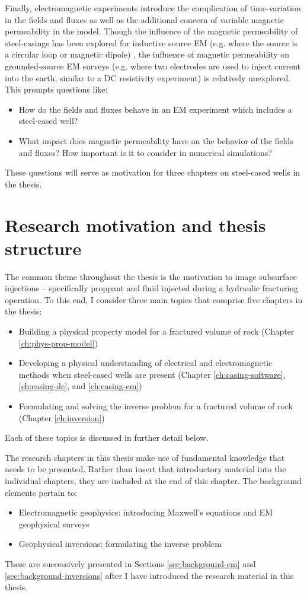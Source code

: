 Finally, electromagnetic experiments introduce the complication of time-variation in the fields and fluxes as well as the additional concern of variable magnetic permeability in the model. Though the influence of the magnetic permeability of steel-casings has been explored for inductive source EM (e.g. where the source is a circular loop or magnetic dipole) \citep{wuhabashy1994}, the influence of magnetic permeability on grounded-source EM surveys (e.g. where two electrodes are used to inject current into the earth, similar to a DC resistivity experiment) is relatively unexplored. This prompts questions like:
\begin{itemize}
\item{How do the fields and fluxes behave in an EM experiment which includes a steel-cased well?}
\item{What impact does magnetic permeability have on the behavior of the fields and fluxes? How important is it to consider in numerical simulations?}
\end{itemize}

These questions will serve as motivation for three chapters on steel-cased wells in the thesis.

\section{Research motivation and thesis structure}
The common theme throughout the thesis is the motivation to image subsurface injections -- specifically proppant and fluid injected during a hydraulic fracturing operation. To this end, I consider three main topics that comprise five chapters in the thesis:
\begin{itemize}
    \item{Building a physical property model for a fractured volume of rock (Chapter \ref{ch:phys-prop-model})}
    \item{Developing a physical understanding of electrical and electromagnetic methods when steel-cased wells are present (Chapter \ref{ch:casing-software}, \ref{ch:casing-dc}, and \ref{ch:casing-em})}
    \item{Formulating and solving the inverse problem for a fractured volume of rock (Chapter \ref{ch:inversion})}
\end{itemize}
Each of these topics is discussed in further detail below.

The research chapters in this thesis make use of fundamental knowledge that needs to be presented. Rather than insert that introductory material into the individual chapters, they are included at the end of this chapter. The background elements pertain to:
\begin{itemize}
\item{Electromagnetic geophysics: introducing Maxwell's equations and EM geophysical surveys}
\item{Geophysical inversions: formulating the inverse problem}
\end{itemize}
These are successively presented in Sections \ref{sec:background-em} and \ref{sec:background-inversions} after I have introduced the research material in this thesis.

